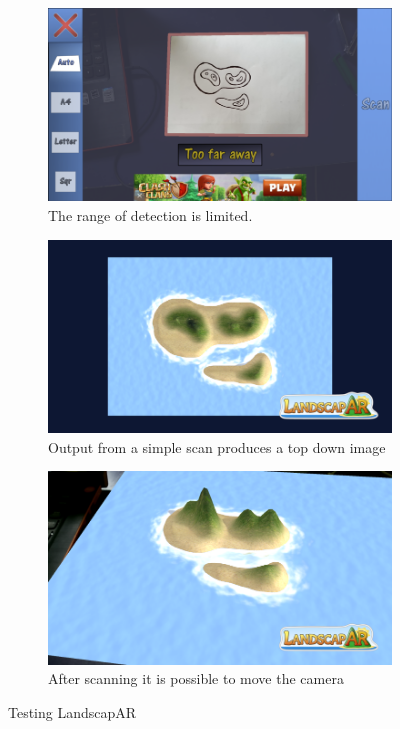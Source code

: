 \documentclass[11pt]{article}
\begin{document}
\begin{figure}[!ht]
	
	\begin{subfigure}[t]{.4\textwidth}
		\centering
		\includegraphics[scale=0.3]{pics/landscapeARTooFar.png}
		\caption{The range of detection is limited.}
		\label{fig:landscapeAugmented RealityNoTooFar}
	\end{subfigure}

	
	\begin{subfigure}[t]{.4\textwidth}
		\centering
		\includegraphics[scale=0.3]{pics/landscapeARtopdown.png}
		\caption{Output from a simple scan produces a top down image}
		\label{fig:landscapeAugmented Realitytopdown}
	\end{subfigure}
	\hfill
	\begin{subfigure}[t]{.4\textwidth}
		\centering
		\includegraphics[scale=0.3]{pics/landscapeARangled.png}
		\caption{After scanning it is possible to move the camera}
		\label{fig:landscapeAugmented Realityangled}
	\end{subfigure}
	\caption{Testing LandscapAR}
	\label{landscapAugmented Reality}
\end{figure}
\end{document}

